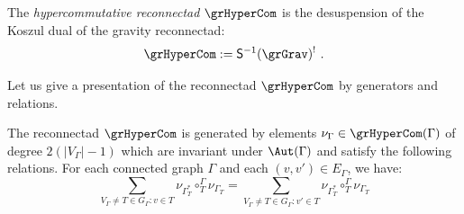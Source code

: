 \begin{defi}
The \emph{hypercommutative reconnectad} $\grHyperCom$ is the desuspension of the Koszul dual of the gravity reconnectad:
 \[
\grHyperCom := \mathsf{S}^{-1}(\grGrav)^! \ . 
 \]
\end{defi}

Let us give a presentation of the reconnectad $\grHyperCom$ by generators and relations.

\begin{prop}\label{prop:hyperpresent}
The reconnectad $\grHyperCom$ is generated by elements $\nu_{\Gamma} \in \grHyperCom(\Gamma)$ of degree $2(|V_\Gamma|-1)$ which are invariant under $\Aut(\Gamma)$ and satisfy the following relations. For each connected graph $\Gamma$ and each $(v,v')\in E_\Gamma$, we have:
\begin{equation}\label{eq:relHyper}
\sum_{V_\Gamma\ne T\in G_\Gamma\colon v \in T} \nu_{\Gamma^*_T}\circ_T^{\Gamma} \nu_{\Gamma_T} =
\sum_{V_\Gamma\ne T\in G_\Gamma\colon v' \in T} \nu_{\Gamma^*_T}\circ_T^{\Gamma} \nu_{\Gamma_T}
\end{equation}
\end{prop}
